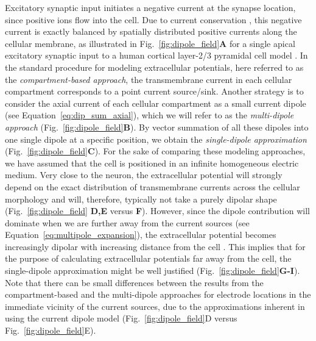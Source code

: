 \documentclass[preprint,10pt,authoryear]{elsarticle}
\newcommand{\hlb}[2][NavyBlue]{ {\sethlcolor{#1} \hl{#2}} }
\newcommand{\hlg}[2][Emerald]{ {\sethlcolor{#1} \hl{#2}} }
\newcommand{\snnote}[1]{\color{white}{\hlb{SN: #1 }}\color{black}}
\newcommand{\sntxt}[1]{{\color{NavyBlue}#1}}
\newcommand{\tvnnote}[1]{\color{white}{\hlg{TVN: #1 }}\color{black}}
\newcommand{\gex}[1]{{\color{Orange}#1}}
\begin{document}
Excitatory synaptic input initiates a negative current at the synapse location, since positive ions flow into the cell. Due to current conservation \citep{Koch1999}, this negative current is exactly balanced by spatially distributed positive currents along the cellular membrane, as illustrated in Fig.~\ref{fig:dipole_field}\textbf{A} for a single apical excitatory synaptic input to a human cortical layer-2/3 pyramidal cell model \citep{EYAL2016}.
In the standard procedure for modeling extracellular potentials, here referred to as the {\it compartment-based approach}, the transmembrane current in each cellular compartment corresponds to a point current source/sink. Another strategy is to consider the axial current of each cellular compartment as a small current dipole (see Equation~\eqref{eq:dip_sum_axial}), which we will refer to as the {\it multi-dipole approach} (Fig.~\ref{fig:dipole_field}\textbf{B}). By \gex{vector summation of} all these dipoles into one single dipole at a specific position, we obtain the {\it single-dipole approximation} (Fig.~\ref{fig:dipole_field}\textbf{C}).
For the sake of comparing these modeling approaches, we have assumed that the cell is positioned in an infinite homogeneous \gex{electric} medium. Very close to the neuron, the extracellular potential will strongly depend on the exact distribution of transmembrane currents across the cellular morphology and  will, therefore, typically not take a purely dipolar shape (Fig.~\ref{fig:dipole_field} \textbf{D,E} versus \textbf{F}). However, since the dipole contribution will dominate when we are further away from the current sources (see Equation~\ref{eq:multipole_expansion}), the extracellular potential becomes increasingly dipolar with \gex{increasing} distance from the cell \citep{LINDEN2010}. \gex{This implies that} for the purpose of calculating extracellular potentials far away from the cell, the single-dipole approximation might be well justified (Fig.~\ref{fig:dipole_field}\textbf{G-I}). Note that there can be small differences between the results from the compartment-based and the multi-dipole approaches for electrode locations in the immediate vicinity of the current sources, due to the 
\gex{approximations inherent in using the current dipole model} (Fig.~\ref{fig:dipole_field}D versus Fig.~\ref{fig:dipole_field}E).
\end{document}
